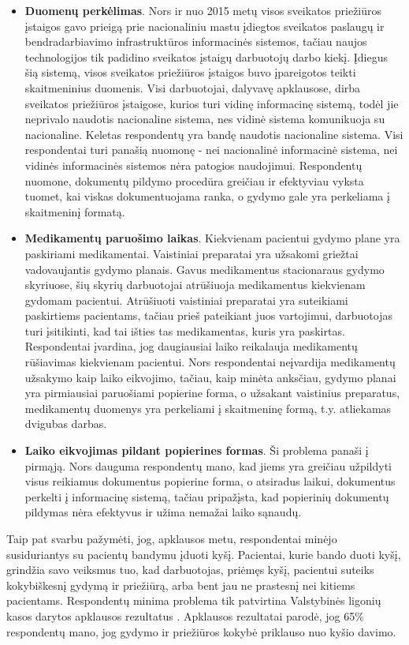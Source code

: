 \begin{itemize}
    \item \textbf{Duomenų perkėlimas}. Nors ir nuo 2015 metų visos sveikatos priežiūros įstaigos gavo prieigą prie nacionaliniu mastu įdiegtos sveikatos paslaugų ir bendradarbiavimo infrastruktūros informacinės sistemos, tačiau naujos technologijos tik padidino sveikatos įstaigų darbuotojų darbo kiekį. Įdiegus šią sistemą, visos sveikatos priežiūros įstaigos buvo įpareigotos teikti skaitmeninius duomenis. Visi darbuotojai, dalyvavę apklausose, dirba sveikatos priežiūros įstaigose, kurios turi vidinę informacinę sistemą, todėl jie neprivalo naudotis nacionaline sistema, nes vidinė sistema komunikuoja su nacionaline. Keletas respondentų yra bandę naudotis nacionaline sistema. Visi respondentai turi panašią nuomonę - nei nacionalinė informacinė sistema, nei vidinės informacinės sistemos nėra patogios naudojimui. Respondentų nuomone, dokumentų pildymo procedūra greičiau ir efektyviau vyksta tuomet, kai viskas dokumentuojama ranka, o gydymo gale yra perkeliama į skaitmeninį formatą.
    \item \textbf{Medikamentų paruošimo laikas}. Kiekvienam pacientui gydymo plane yra paskiriami medikamentai. Vaistiniai preparatai yra užsakomi griežtai vadovaujantis gydymo planais. Gavus medikamentus stacionaraus gydymo skyriuose, šių skyrių darbuotojai atrūšiuoja medikamentus kiekvienam gydomam pacientui. Atrūšiuoti vaistiniai preparatai yra suteikiami paskirtiems pacientams, tačiau prieš pateikiant juos vartojimui, darbuotojas turi įsitikinti, kad tai išties tas medikamentas, kuris yra paskirtas. Respondentai įvardina, jog daugiausiai laiko reikalauja medikamentų rūšiavimas kiekvienam pacientui. Nors respondentai neįvardija medikamentų užsakymo kaip laiko eikvojimo, tačiau, kaip minėta anksčiau, gydymo planai yra pirmiausiai paruošiami popierine forma, o užsakant vaistinius preparatus, medikamentų duomenys yra perkeliami į skaitmeninę formą, t.y. atliekamas dvigubas darbas.
    \item \textbf{Laiko eikvojimas pildant popierines formas}. Ši problema panaši į pirmąją. Nors dauguma respondentų mano, kad jiems yra greičiau užpildyti visus reikiamus dokumentus popierine forma, o atsiradus laikui, dokumentus perkelti į  informacinę sistemą, tačiau pripažįsta, kad popierinių dokumentų pildymas nėra efektyvus ir užima nemažai laiko sąnaudų.
\end{itemize}

Taip pat svarbu pažymėti, jog, apklausos metu, respondentai minėjo susiduriantys su pacientų bandymu įduoti kyšį. Pacientai, kurie bando duoti kyšį, grindžia savo veiksmus tuo, kad darbuotojas, priėmęs kyšį, pacientui suteiks kokybiškesnį gydymą ir priežiūrą, arba bent jau ne prastesnį nei kitiems pacientams. Respondentų minima problema tik patvirtina Valstybinės ligonių kasos darytos apklausos rezultatus \cite{Kasa2016}. Apklausos rezultatai parodė, jog 65\% respondentų mano, jog gydymo ir priežiūros kokybė priklauso nuo kyšio davimo. 

